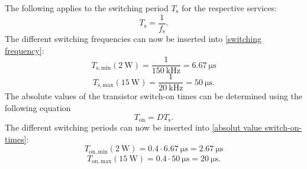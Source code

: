  \begin{solutionblock}
 The following applies to the switching period $T_\mathrm{s}$ for the respective services:  
 \begin{equation}
    T_\mathrm{s} = \frac{1}{f_\mathrm{s}}. \label{switching frequency}
 \end{equation}
 The different switching frequencies can now be inserted into \ref{switching frequency}:
 \begin{equation}
    T_\mathrm{s,min}(\SI{2}{\watt}) = \frac{1}{\SI{150}{\kilo \hertz}}= \SI{6.67}{\micro \s}
 \end{equation}
 \begin{equation}
    T_\mathrm{s,max}(\SI{15}{\watt}) = \frac{1}{\SI{20}{\kilo \hertz}}= \SI{50}{\micro \s}.
 \end{equation}
 The absolute values of the transistor switch-on times can be determined using the following equation
 \begin{equation}
    T_\mathrm{on} = D T_\mathrm{s}. \label{absolut value switch-on-times}
 \end{equation}
 The different switching periods can now be inserted into \ref{absolut value switch-on-times}:
 \begin{equation}
    T_\mathrm{on,min}(\SI{2}{\watt}) = 0.4 \cdot \SI{6.67}{\micro \s} = \SI{2.67}{\micro \s}
 \end{equation}
 \begin{equation}
    T_\mathrm{on,max}(\SI{15}{\watt}) = 0.4 \cdot \SI{50}{\micro \s}= \SI{20}{\micro \s}.
 \end{equation}
 \end{solutionblock}

\begin{solutionblock}
       
\end{solutionblock}
    



